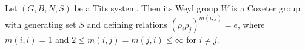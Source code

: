 Let $(G, B, N, S)$ be a Tits system. Then its Weyl group $W$ is a Coxeter group with generating set $S$ and defining relations $(\rho_i \rho_j)^{m(i,j)} = e$, where $m(i,i) = 1$ and $2 \leqslant m(i,j) = m(j,i) \leqslant \infty$ for $i \neq j$.
